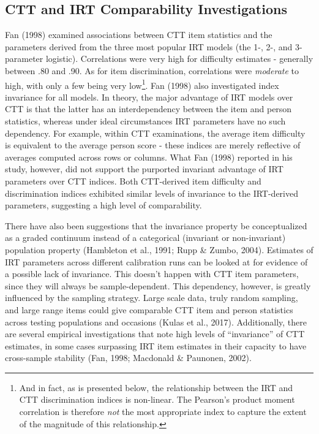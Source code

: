 \documentclass[
  jou]{apa6}
\begin{document}
\hypertarget{ctt-and-irt-comparability-investigations}{%
\subsection{CTT and IRT Comparability Investigations}\label{ctt-and-irt-comparability-investigations}}

Fan (1998) examined associations between CTT item statistics and the parameters derived from the three most popular IRT models (the 1-, 2-, and 3-parameter logistic). Correlations were very high for difficulty estimates - generally between .80 and .90. As for item discrimination, correlations were \emph{moderate} to high, with only a few being very low\footnote{And in fact, as is presented below, the relationship between the IRT and CTT discrimination indices is non-linear. The Pearson's product moment correlation is therefore \emph{not} the most appropriate index to capture the extent of the magnitude of this relationship.}. Fan (1998) also investigated index invariance for all models. In theory, the major advantage of IRT models over CTT is that the latter has an interdependency between the item and person statistics, whereas under ideal circumstances IRT parameters have no such dependency. For example, within CTT examinations, the average item difficulty is equivalent to the average person score - these indices are merely reflective of averages computed across rows or columns. What Fan (1998) reported in his study, however, did not support the purported invariant advantage of IRT parameters over CTT indices. Both CTT-derived item difficulty and discrimination indices exhibited similar levels of invariance to the IRT-derived parameters, suggesting a high level of comparability.

There have also been suggestions that the invariance property be conceptualized as a graded continuum instead of a categorical (invariant or non-invariant) population property (Hambleton et al., 1991; Rupp \& Zumbo, 2004). Estimates of IRT parameters across different calibration runs can be looked at for evidence of a possible lack of invariance. This doesn't happen with CTT item parameters, since they will always be sample-dependent. This dependency, however, is greatly influenced by the sampling strategy. Large scale data, truly random sampling, and large range items could give comparable CTT item and person statistics across testing populations and occasions (Kulas et al., 2017). Additionally, there are several empirical investigations that note high levels of ``invariance'' of CTT estimates, in some cases surpassing IRT item estimates in their capacity to have cross-sample stability (Fan, 1998; Macdonald \& Paunonen, 2002).
\end{document}
